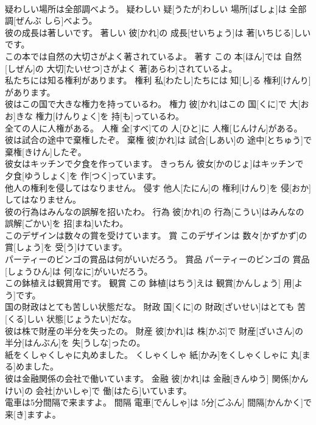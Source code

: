 \documentclass[8pt]{extreport}
\begin{document}
\begin{CJK}{UTF8}{min}
\\	疑わしい場所は全部調べよう。	疑わしい	疑[うたが]わしい 場所[ばしょ]は 全部調[ぜんぶ しら]べよう。	
\\	彼の成長は著しいです。	著しい	彼[かれ]の 成長[せいちょう]は 著[いちじる]しいです。	
\\	この本では自然の大切さがよく著されているよ。	著す	この 本[ほん]では 自然[しぜん]の 大切[たいせつ]さがよく 著[あらわ]されているよ。	
\\	私たちには知る権利があります。	権利	私[わたし]たちには 知[し]る 権利[けんり]があります。	
\\	彼はこの国で大きな権力を持っているわ。	権力	彼[かれ]はこの 国[くに]で 大[おお]きな 権力[けんりょく]を 持[も]っているわ。	
\\	全ての人に人権がある。	人権	全[すべ]ての 人[ひと]に 人権[じんけん]がある。	
\\	彼は試合の途中で棄権したぞ。	棄権	彼[かれ]は 試合[しあい]の 途中[とちゅう]で 棄権[きけん]したぞ。	
\\	彼女はキッチンで夕食を作っています。	きっちん	彼女[かのじょ]はキッチンで 夕食[ゆうしょく]を 作[つく]っています。	
\\	他人の権利を侵してはなりません。	侵す	他人[たにん]の 権利[けんり]を 侵[おか]してはなりません。	
\\	彼の行為はみんなの誤解を招いたわ。	行為	彼[かれ]の 行為[こうい]はみんなの 誤解[ごかい]を 招[まね]いたわ。	
\\	このデザインは数々の賞を受けています。	賞	このデザインは 数々[かずかず]の 賞[しょう]を 受[う]けています。	
\\	パーティーのビンゴの賞品は何がいいだろう。	賞品	パーティーのビンゴの 賞品[しょうひん]は 何[なに]がいいだろう。	
\\	この鉢植えは観賞用です。	観賞	この 鉢植[はちう]えは 観賞[かんしょう] 用[よう]です。	
\\	国の財政はとても苦しい状態だな。	財政	国[くに]の 財政[ざいせい]はとても 苦[くる]しい 状態[じょうたい]だな。	
\\	彼は株で財産の半分を失ったの。	財産	彼[かれ]は 株[かぶ]で 財産[ざいさん]の 半分[はんぶん]を 失[うしな]ったの。	
\\	紙をくしゃくしゃに丸めました。	くしゃくしゃ	紙[かみ]をくしゃくしゃに 丸[まる]めました。	
\\	彼は金融関係の会社で働いています。	金融	彼[かれ]は 金融[きんゆう] 関係[かんけい]の 会社[かいしゃ]で 働[はたら]いています。	
\\	電車は5分間隔で来ますよ。	間隔	電車[でんしゃ]は 5分[ごふん] 間隔[かんかく]で 来[き]ますよ。	

\end{CJK}
\end{document}
